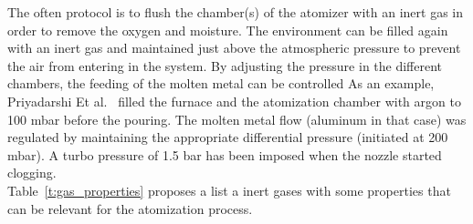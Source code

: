 \documentclass[../main]{subfiles}
\begin{document}
The often protocol is to flush the chamber(s) of the atomizer with an inert gas in order to remove the oxygen and moisture. The environment can be filled again with an inert gas and maintained just above the atmospheric pressure to prevent the air from entering in the system. By adjusting the pressure in the different chambers, the feeding of the molten metal can be controlled As an example, Priyadarshi Et al.~\cite{Priyadarshi2024NewInsights} filled the furnace and the atomization chamber with argon to 100 mbar before the pouring. The molten metal flow (aluminum in that case) was regulated by maintaining the appropriate differential pressure (initiated at 200 mbar). A turbo pressure of 1.5 bar has been imposed when the nozzle started clogging.\\

Table~\ref{t:gas_properties} proposes a list a inert gases with some properties that can be relevant for the atomization process.
\end{document}
